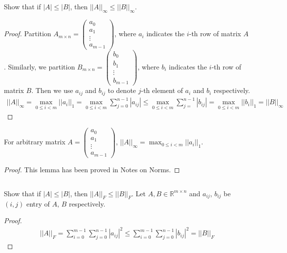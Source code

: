 \documentclass[11pt,a4paper]{article}
\begin{document}
\subsection{}
Show that if $|A| \leq |B|$, then $||A||_{\infty}\leq||B||_{\infty}$.
\begin{proof}
    Partition 
    $A_{m \times n} = \left( \begin{array}{c} a_0 \\ \hline a_1 \\\hline \vdots \\\hline a_{m-1} \end{array} \right)$, 
    where $a_i$ indicates the $i$-th row of matrix $A$. 
    Similarly, we partition 
    $B_{m \times n} = \left( \begin{array}{c} b_0 \\ \hline b_1 \\\hline \vdots \\\hline b_{m-1} \end{array} \right)$, 
    where $b_i$ indicates the $i$-th row of matrix $B$. 
    Then we use $a_{ij}$ and $b_{ij}$ to denote $j$-th element of $a_i$ and $b_i$ respectively.
    \begin{align}
        || A ||_{\infty}
        = \max_{0 \leq i < m} || a_i ||_1 
        = \max_{0 \leq i < m} \sum_{j=0}^{n-1} |a_{ij}| 
        \leq \max_{0 \leq i < m} \sum_{j=}^{n-1} |b_{ij}| 
        = \max_{0 \leq i < m} || b_i ||_1 
        = || B ||_{\infty}
    \end{align}
\end{proof}
\begin{lemma}
    For arbitrary matrix
    $A = \left( \begin{array}{c} a_0 \\ \hline a_1 \\\hline \vdots \\\hline a_{m-1} \end{array} \right)$, 
    $|| A ||_{\infty} = \max_{0 \leq i < m} || a_i ||_1 $.
\begin{proof}
    This lemma has been proved in Notes on Norms.    
\end{proof}
\end{lemma}

\subsection{}
Show that if $|A| \leq |B|$, then $||A||_F\leq||B||_F$.
Let $A, B \in \mathbb{R}^{m\times n}$ and 
$a_{ij}$, $b_{ij}$ be $(i,j)$ entry of $A$, $B$ respectively.
\begin{proof}
    \begin{align}
        ||A||_F 
        = \sum_{i=0}^{m-1} \sum_{j=0}^{n-1} |a_{ij}|^2
        \leq \sum_{i=0}^{m-1} \sum_{j=0}^{n-1} |b_{ij}|^2
        = ||B||_F
    \end{align}
\end{proof}
\end{document}
